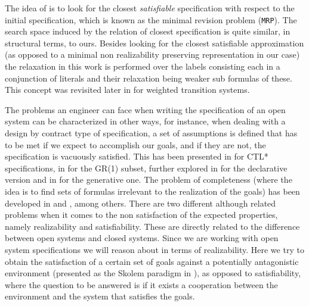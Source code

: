 

The idea of \cite{DBLP:conf/icra/KimFS12} is to look for the closest \textit{satisfiable} specification with respect to the initial specification, which is known as the minimal revision problem (\texttt{MRP}).  The search space induced by the relation of closest specification is quite similar, in structural terms, to ours. Besides looking for the closest satisfiable approximation (as opposed to a minimal non realizability preserving representation in our case) the relaxation in this work is performed over the labels consisting each in a conjunction of literals and their relaxation being weaker sub formulas of these.  This concept was revisited later in \cite{DBLP:conf/icra/KimF13} for weighted transition systems.



The problems an engineer can face when writing the specification
of an open system can be characterized in other ways, for instance, 
when dealing with a design by contract type of specification, a set of assumptions is defined that has to be met
if we expect to accomplish our goals, and
if they are not, the specification is vacuously satisfied.
This has been presented in \cite{kupferman2003vacuity}
for CTL* specifications, in \cite{DBLP:conf/hvc/KleinP10} for the
GR(1)\cite{DBLP:conf/vmcai/PitermanPS06} subset, further explored in \cite{DBLP:conf/sigsoft/MaozR16}
for the declarative version and in \cite{DBLP:phd/ethos/DIppolito13}
for the generative one.  
The problem of completeness (where the idea is to find sets of formulas
irrelevant to the realization of the goals) has been
developed in \cite{chockler2001practical} and \cite{chockler2001coverage},
among others.
There are two different although related problems when it comes to 
the non satisfaction of the expected properties, namely
 realizability and satisfiability.
 These are directly related to the difference
between open systems and closed systems.  
Since 
we are working with open system specifications we will reason about in terms of
realizability.  Here we try to obtain the 
satisfaction of a certain set of goals against a
potentially antagonistic environment (presented as the Skolem paradigm in 
\cite{DBLP:conf/popl/PnueliR89}), as opposed to satisfiability, where
the question to be answered is if it exists a cooperation between 
the environment and the system that satisfies the goals.


